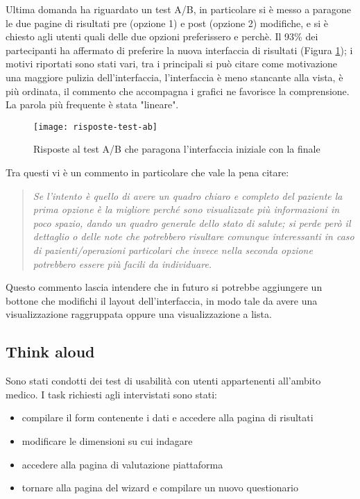 Ultima domanda ha riguardato un test A/B, in particolare si è messo a paragone le due pagine di risultati pre (opzione 1) e post (opzione 2) modifiche, e si è chiesto agli utenti quali delle due opzioni preferissero e perchè. Il 93\% dei partecipanti ha affermato di preferire la nuova interfaccia di risultati (Figura \ref{fig:risposte-test-ab}); i motivi riportati sono stati vari, tra i principali si può citare come motivazione una maggiore pulizia dell'interfaccia, l'interfaccia è meno stancante alla vista, è più ordinata, il commento che accompagna i grafici ne favorisce la comprensione. La parola più frequente è stata "lineare". \\

\begin{figure}[!ht] 
    \centering 
    \texttt{[image: risposte-test-ab]}
    \caption{Risposte al test A/B che paragona l'interfaccia iniziale con la finale}
    \label{fig:risposte-test-ab}
\end{figure}

Tra questi vi è un commento in particolare che vale la pena citare: 
\begin{quote}
    \textit{Se l'intento è quello di avere un quadro chiaro e completo del paziente la prima opzione è la migliore perché sono visualizzate più informazioni in poco spazio, dando un quadro generale dello stato di salute; si perde però il dettaglio o delle note che potrebbero risultare comunque interessanti in caso di pazienti/operazioni particolari che invece nella seconda opzione potrebbero essere più facili da individuare.}
\end{quote}
Questo commento lascia intendere che in futuro si potrebbe aggiungere un bottone che modifichi il layout dell'interfaccia, in modo tale da avere una visualizzazione raggruppata oppure una visualizzazione a lista.

\subsection{Think aloud}
Sono stati condotti dei test di usabilità con utenti appartenenti all'ambito medico.
I task richiesti agli intervistati sono stati:
\begin{itemize}
    \item compilare il form contenente i dati e accedere alla pagina di risultati
    \item modificare le dimensioni su cui indagare
    \item accedere alla pagina di valutazione piattaforma
    \item tornare alla pagina del wizard e compilare un nuovo questionario 
\end{itemize}


